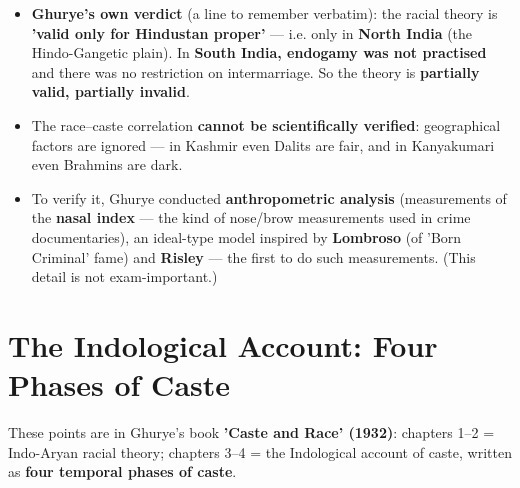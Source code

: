 \begin{CriticalPoint}
\begin{itemize}
\item \textbf{Ghurye's own verdict} (a line to remember verbatim): the racial theory is \textbf{'valid only for Hindustan proper'} --- i.e. only in \textbf{North India} (the Hindo-Gangetic plain). In \textbf{South India, endogamy was not practised} and there was no restriction on intermarriage. So the theory is \textbf{partially valid, partially invalid}.
\item The race--caste correlation \textbf{cannot be scientifically verified}: geographical factors are ignored --- in Kashmir even Dalits are fair, and in Kanyakumari even Brahmins are dark.
\item To verify it, Ghurye conducted \textbf{anthropometric analysis} (measurements of the \textbf{nasal index} --- the kind of nose/brow measurements used in crime documentaries), an ideal-type model inspired by \textbf{Lombroso} (of 'Born Criminal' fame) and \textbf{Risley} --- the first to do such measurements. (This detail is not exam-important.)
\end{itemize}
\end{CriticalPoint}

\section{The Indological Account: Four Phases of Caste}

These points are in Ghurye's book \textbf{'Caste and Race' (1932)}: chapters 1--2 = Indo-Aryan racial theory; chapters 3--4 = the Indological account of caste, written as \textbf{four temporal phases of caste}.


